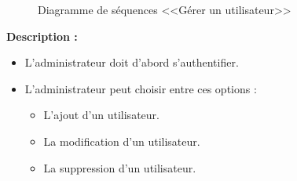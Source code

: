 \documentclass[12pt]{report}
\begin{document}
\newpage

\begin{figure}[h]
\centering
    \centerline{}
    \caption{Diagramme de séquences <<G\'erer un utilisateur>>}
\end{figure}

\vspace{0.3in}

\textbf{Description :}

\begin{itemize}
    \item L'administrateur doit d'abord s'authentifier.
    \item L'administrateur peut choisir entre ces options :
    \begin{itemize}
        \item L'ajout d'un utilisateur.
        \item La modification d'un utilisateur.
        \item La suppression d'un utilisateur.
    \end{itemize}
\end{itemize}
\end{document}
